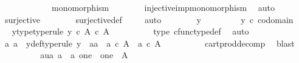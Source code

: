 \begin{isabellebody}
\ \ \ \ \isamarkupfalse%
\isanewline
\ \ \ \ \isamarkupfalse%
\ \isamarkupfalse%
\ {\isachardoublequoteopen}monomorphism{\isacharparenleft}{\kern0pt}{\isasymphi}{\isacharparenright}{\kern0pt}{\isachardoublequoteclose}\isanewline
\ \ \ \ \ \ \isamarkupfalse%
\ injective{\isacharunderscore}{\kern0pt}imp{\isacharunderscore}{\kern0pt}monomorphism\ \isamarkupfalse%
\ auto\isanewline
\ \ \ \ \isamarkupfalse%
\ {\isachardoublequoteopen}surjective{\isacharparenleft}{\kern0pt}{\isasymphi}{\isacharparenright}{\kern0pt}{\isachardoublequoteclose}\isanewline
\ \ \ \ \ \ \isamarkupfalse%
\ surjective{\isacharunderscore}{\kern0pt}def\isanewline
\ \ \ \ \isamarkupfalse%
{\isacharparenleft}{\kern0pt}auto{\isacharparenright}{\kern0pt}\isanewline
\ \ \ \ \ \ \isamarkupfalse%
\ y\ \isanewline
\ \ \ \ \ \ \isamarkupfalse%
\ {\isachardoublequoteopen}y\ {\isasymin}\isactrlsub c\ codomain\ {\isasymphi}{\isachardoublequoteclose}\ \isamarkupfalse%
\ \isamarkupfalse%
\ y{\isacharunderscore}{\kern0pt}type{\isacharbrackleft}{\kern0pt}type{\isacharunderscore}{\kern0pt}rule{\isacharbrackright}{\kern0pt}{\isacharcolon}{\kern0pt}\ {\isachardoublequoteopen}y\ {\isasymin}\isactrlsub c\ A\ {\isasymtimes}\isactrlsub c\ A{\isachardoublequoteclose}\isanewline
\ \ \ \ \ \ \ \ \isamarkupfalse%
\ {\isasymphi}{\isacharunderscore}{\kern0pt}type\ cfunc{\isacharunderscore}{\kern0pt}type{\isacharunderscore}{\kern0pt}def\ \isamarkupfalse%
\ auto\isanewline
\ \ \ \ \ \ \isamarkupfalse%
\ \isamarkupfalse%
\ a{}\ a{}\ \ y{\isacharunderscore}{\kern0pt}def{\isacharbrackleft}{\kern0pt}type{\isacharunderscore}{\kern0pt}rule{\isacharbrackright}{\kern0pt}{\isacharcolon}{\kern0pt}\ {\isachardoublequoteopen}y\ {\isacharequal}{\kern0pt}\ {\isasymlangle}a{}{\isacharcomma}{\kern0pt}a{}{\isasymrangle}\ {\isasymand}\ a{}\ {\isasymin}\isactrlsub c\ A\ {\isasymand}\ a{}\ {\isasymin}\isactrlsub c\ A{\isachardoublequoteclose}\isanewline
\ \ \ \ \ \ \ \ \isamarkupfalse%
\ cart{\isacharunderscore}{\kern0pt}prod{\isacharunderscore}{\kern0pt}decomp\ \isamarkupfalse%
\ blast\isanewline
\ \ \ \ \ \ \isamarkupfalse%
\ \isamarkupfalse%
\ aua{\isacharcolon}{\kern0pt}\ {\isachardoublequoteopen}{\isacharparenleft}{\kern0pt}a{}\ {\isasymamalg}\ a{}{\isacharparenright}{\kern0pt}{\isacharcolon}{\kern0pt}\ one\ {\isasymCoprod}\ one\ {\isasymrightarrow}\ A{\isachardoublequoteclose}\isanewline

\end{isabellebody}
